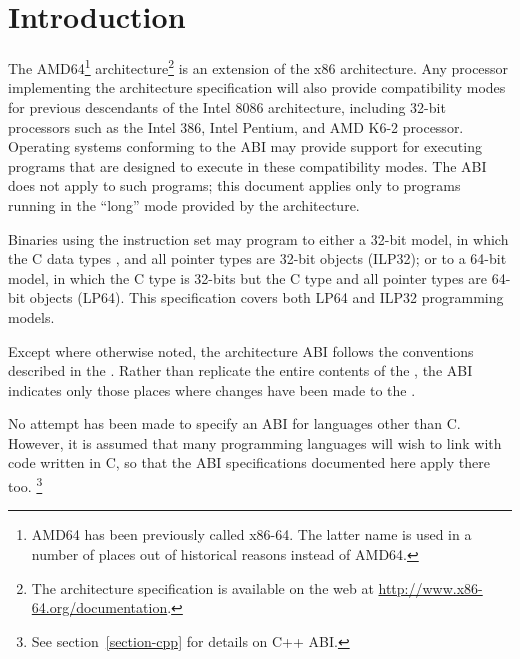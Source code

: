 \chapter{Introduction\label{intro}}

The AMD64\footnote{AMD64 has been previously called x86-64.  The
  latter name is used in a number of places out of historical reasons
  instead of AMD64.}  architecture\footnote{The architecture
  specification is available on the web at
  \url{http://www.x86-64.org/documentation}.} is an extension of the
x86 architecture.  Any processor implementing the \xARCH architecture
specification will also provide compatibility modes for previous
descendants of the Intel 8086 architecture, including 32-bit
processors such as the Intel 386, Intel Pentium, and AMD K6-2
processor.  Operating systems conforming to the \xARCH ABI may provide
support for executing programs that are designed to execute in these
compatibility modes.  The \xARCH ABI does not apply to such programs;
this document applies only to programs running in the ``long'' mode
provided by the \xARCH architecture.

Binaries using the \xARCH instruction set may program to either a 32-bit
model, in which the C data types ,  and all
pointer types are 32-bit objects (ILP32); or to a 64-bit model,
in which the C  type is 32-bits but the C  type
and all pointer types are 64-bit objects (LP64). This specification
covers both LP64 and ILP32 programming models.

Except where otherwise noted, the \xARCH architecture ABI follows the
conventions described in the \intelabi.  Rather than replicate the
entire contents of the \intelabi, the \xARCH ABI indicates only those
places where changes have been made to the \intelabi.

No attempt has been made to specify an ABI for languages other than C.
However, it is assumed that many programming languages will wish to
link with code written in C, so
that the ABI specifications documented here apply there too.%
\footnote{See section~\ref{section-cpp} for details on C++ ABI.}

